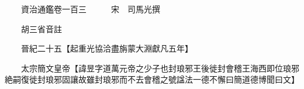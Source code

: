 










 


 
 


 

  
  
  
  
  





  
  
  
  
  
 
  

  

  
  
  



  

 
 

  
   




  

  
  


  　　資治通鑑卷一百三　　　宋　司馬光撰

　　胡三省音註

　　晉紀二十五【起重光協洽盡旃蒙大淵獻凡五年】

　　太宗簡文皇帝【諱昱字道萬元帝之少子也封琅邪王後徙封會稽王海西即位琅邪絶嗣復徙封琅邪固讓故雖封琅邪而不去會稽之號諡法一德不懈曰簡道德博聞曰文】

